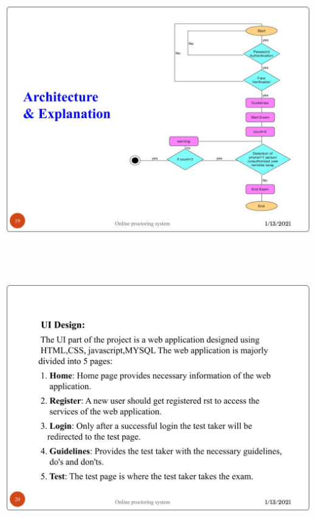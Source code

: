 \documentclass[12pt]{report}
\begin{document}
\includegraphics[width=17cm,height=12cm]{INTERNSHIP SAMPLE PRESENTATION (18)}\\
\includegraphics[width=17cm,height=12cm]{INTERNSHIP SAMPLE PRESENTATION (19)}\\
\end{document}
